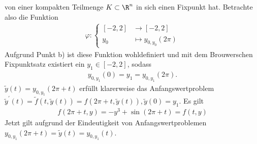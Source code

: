 \begin{solution}
\begin{enumerate}[label = \textbf{\alph*)}]
  von einer kompakten Teilmenge $K \subset \R^n$ in sich einen Fixpunkt hat.
  Betrachte also die Funktion
  \begin{align*}
    \varphi: \begin{cases}
      [-2,2] &\to [-2,2] \\
      y_0 &\mapsto y_{0,y_0}(2\pi)
    \end{cases}
  \end{align*}
  Aufgrund Punkt b) ist diese Funktion wohldefiniert und mit dem Brouwerschen Fixpunktsatz
  existiert ein $y_1 \in [-2,2]$, sodass
  \begin{align*}
    y_{0,y_1}(0) = y_1 = y_{0,y_1}(2\pi).
  \end{align*}
  $\widetilde{y}(t) = y_{0,y_1}(2\pi + t)$ erfüllt klarerweise das Anfangswertproblem $\widetilde{y}^{\prime}(t) =
  \widetilde{f}(t,\widetilde{y}(t)) = f(2\pi+t,\widetilde{y}(t)),
  \widetilde{y}(0) = y_1$. Es gilt
  \begin{align*}
    f(2\pi + t,y) = -y^3 + \sin(2\pi + t) = f(t,y)
  \end{align*}
  Jetzt gilt aufgrund der Eindeutigkeit von Anfangswertproblemen
  $y_{0,y_1}(2\pi + t) = \widetilde{y}(t) = y_{0,y_1}(t)$.
\end{enumerate}
\end{solution}
